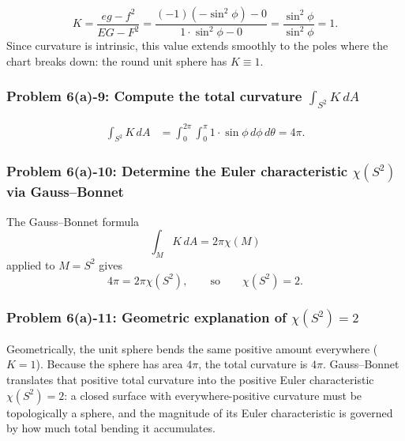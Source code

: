 \documentclass[11pt]{article}
\begin{document}
\[
 K=\frac{eg-f^2}{EG-F^2}
 =
 \frac{(-1)(-\sin^2\phi)-0}{1\cdot\sin^2\phi-0}
 =
 \frac{\sin^2\phi}{\sin^2\phi}
 =
 1.
\]
Since curvature is intrinsic, this value extends smoothly to the poles where the chart breaks down: the round unit sphere has $K\equiv 1$.

\subsubsection*{Problem 6(a)-9: Compute the total curvature $\int_{S^2}K\,dA$}

\[
\begin{aligned}
 \int_{S^2}K\,dA
 &=
 \int_0^{2\pi}\int_0^\pi
 1\cdot\sin\phi\,d\phi\,d\theta
 =4\pi.
\end{aligned}
\]

\subsubsection*{Problem 6(a)-10: Determine the Euler characteristic $\chi(S^2)$ via Gauss--Bonnet}

The Gauss--Bonnet formula
\[
 \int_MK\,dA=2\pi\chi(M)
\]
applied to $M=S^2$ gives
\[
 4\pi=2\pi\chi(S^2),
\qquad\text{so}\qquad
 \chi(S^2)=2.
\]

\subsubsection*{Problem 6(a)-11: Geometric explanation of $\chi(S^2)=2$}

Geometrically, the unit sphere bends the same positive amount everywhere ($K=1$). Because the sphere has area $4\pi$, the total curvature is $4\pi$. Gauss--Bonnet translates that positive total curvature into the positive Euler characteristic $\chi(S^2)=2$: a closed surface with everywhere-positive curvature must be topologically a sphere, and the magnitude of its Euler characteristic is governed by how much total bending it accumulates.
\end{document}
